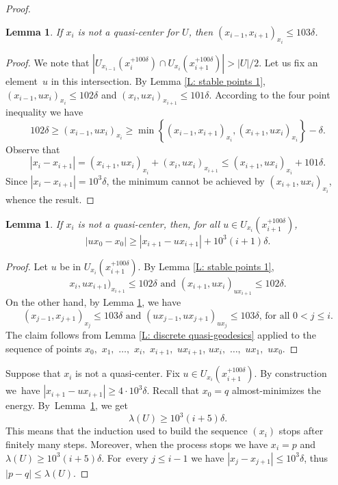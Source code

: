 \documentclass[JEP,XML,SOM,Unicode, NoEqCountersInSection,published]{cedram}
\theoremstyle{plain}
\newtheorem{lem}[thm]{Lemma}
\theoremstyle{definition}
\begin{document}
\begin{proof}
\begin{lem}\label{L: stable points 2}
If $x_i$ is not a quasi-center for $U$, then $(x_{i-1},x_{i+1})_{x_i}\leqslant 103\delta$.
\end{lem}

\begin{proof}
We note that $ |U_{x_{i-1}}(x_{i}^{+100\delta}) \cap U_{x_{i}}(x_{i+1}^{+100\delta})|>|U|/2.$
Let us fix an element~$u$ in this intersection.
By Lemma \ref{L: stable points 1}, $(x_{i-1},ux_i)_{x_i} \leq 102\delta$ and $(x_{i},ux_{i})_{x_{i+1}}\leq 101\delta$.
According to the four point inequality we have
\begin{equation*}
102 \delta
\geq (x_{i-1},ux_i)_{x_i}
\geq \min \left\{ (x_{i-1},x_{i+1})_{x_i}, (x_{i+1},ux_i)_{x_i}\right\} - \delta.
\end{equation*}
Observe that
\begin{equation*}
|x_i - x_{i+1}|
= (x_{i+1}, ux_i)_{x_i} +(x_i,ux_i)_{x_{i+1}}
\leq (x_{i+1}, ux_i)_{x_i} + 101\delta.
\end{equation*}
Since $|x_i - x_{i+1}| = 10^3\delta$, the minimum cannot be achieved by $(x_{i+1},ux_i)_{x_i}$, whence the result.
\end{proof}

\begin{lem}\label{L: stable points 3} If $x_i$ is not a quasi-center, then, for all $u\in U_{x_i}(x_{i+1}^{+100 \delta})$,
\[
|ux_0 -x_0 | \geq |{x_{i+1}}-ux_{i+1}| + 10^3(i+1) \delta .
\]
\end{lem}

\begin{proof}
Let $u$ be in $U_{x_i}(x_{i+1}^{+100 \delta})$.
By Lemma \ref{L: stable points 1},
\begin{equation*}
x_i,ux_{i+1})_{x_{i+1}} \leq 102\delta \text{ and } (x_{i+1},ux_i)_{ux_{i+1}} \leq 102\delta.
\end{equation*}
On the other hand, by Lemma \ref{L: stable points 2}, we have
\begin{equation*}
(x_{j-1},x_{j+1})_{x_{j}} \leqslant 103\delta \text{ and } (ux_{j-1},ux_{j+1})_{ux_{j}}\leqslant 103\delta\text{, for all $0< j \leqslant i$}.
\end{equation*}
The claim follows from Lemma \ref{L: discrete quasi-geodesics} applied to the sequence of points $x_0,$ $x_1,$ $\dots,$ $x_i,$ $x_{i+1},$ $ux_{i+1}$, $ ux_i,$ $\dots,$ $ux_1,$ $ux_0$.
\end{proof}

Suppose that $x_i$ is not a quasi-center.
Fix $u\in U_{x_i}(x_{i+1}^{+100 \delta})$.
By construction we~have $|{x_{i+1}}-ux_{i+1}|\geq 4\cdot 10^3\delta$.
Recall that $x_0 = q$ almost-minimizes the energy.
By~Lemma~\ref{L: stable points 3}, we get
\[
\lambda(U) \geq 10^3(i+5) \delta. 
\]
This means that the induction used to build the sequence $(x_i)$ stops after finitely many steps.
Moreover, when the process stops we have $x_i = p$ and $\lambda(U) \geq 10^3(i+5) \delta$.
For~every $j \leq i-1$ we have $| x_j - x_{j+1}| \leq 10^3\delta$, thus $|p - q| \leq \lambda(U)$.
\end{proof}
\end{document}
